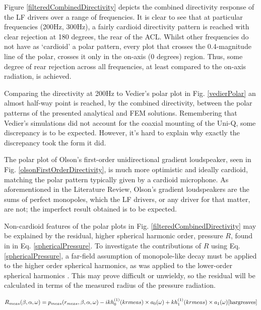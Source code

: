 \documentclass{report}
\begin{document}
    Figure \ref{filteredCombinedDirectivity} depicts the combined directivity response of the LF drivers over a range of frequencies.
    It is clear to see that at particular frequencies (200Hz, 300Hz), a fairly cardioid directivity pattern is reached with clear rejection at 180 degrees, the rear of the ACL.
    Whilst other frequencies do not have as `cardioid' a polar pattern, every plot that crosses the 0.4-magnitude line of the polar, crosses it only in the on-axis (0 degrees) region.
    Thus, some degree of rear rejection across all frequencies, at least compared to the on-axis radiation, is achieved.

    Comparing the directivity at 200Hz to Vedier's polar plot in Fig. \ref{vedierPolar} an almost half-way point is reached, by the combined directivity, between the polar patterns of the presented analytical and FEM solutions.
    Remembering that Vedier's simulations did not account for the coaxial mounting of the Uni-Q, some discrepancy is to be expected.
    However, it's hard to explain why exactly the discrepancy took the form it did.

    The polar plot of Olson's first-order unidirectional gradient loudspeaker, seen in Fig. \ref{olsonFirstOrderDirectivity}, is much more optimistic and ideally cardioid, matching the polar pattern typically given by a cardioid microphone.
    As aforementioned in the Literature Review, Olson's gradient loudspeakers are the sums of perfect monopoles, which the LF drivers, or any driver for that matter, are not; the imperfect result obtained is to be expected.

    Non-cardioid features of the polar plots in Fig. \ref{filteredCombinedDirectivity} may be explained by the residual, higher spherical harmonic order, pressure $R$, found in in Eq. \ref{sphericalPressure}.
    To investigate the contributions of $R$ using Eq. \ref{sphericalPressure}, a far-field assumption of monopole-like decay must be applied to the higher order spherical harmonics, as was applied to the lower-order spherical harmonics \cite{hargreaves}.
    This may prove difficult or unwieldy, so the residual will be calculated in terms of the measured radius of the pressure radiation.

    \begin{equation}
        R_{meas}(\beta,\alpha,\omega) = p_{meas}(r_{meas},\beta,\alpha,\omega) - ikh_0^{(1)}(kr{meas}) \times a_0(\omega) + kh_1^{(1)}(kr{meas}) \times a_1(\omega)\cite{hargreaves}
        \label{residualEquation}
    \end{equation}
\end{document}
